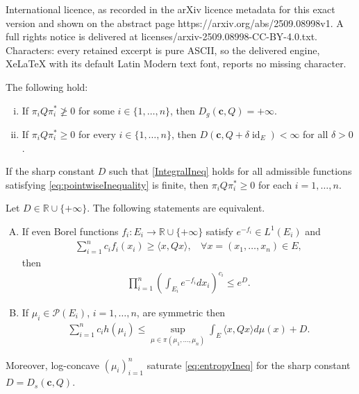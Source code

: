 \documentclass[10pt,a4paper]{amsart}
\newcommand{\id}{\operatorname{id}}
\begin{document}
International licence, as recorded in the arXiv licence metadata for this exact version and shown on the abstract page https://arxiv.org/abs/2509.08998v1. A full rights notice is delivered at licenses/arxiv-2509.08998-CC-BY-4.0.txt. Characters: every retained excerpt is pure ASCII, so the delivered engine, XeLaTeX with its default Latin Modern text font, reports no missing character.
\begin{proposition}\label{prop:Qblocks}The following hold:
\begin{enumerate}[(i)]
\item If $\pi_i Q \pi^*_i \not\geq 0$ for some $i\in \{1,\dots, n\}$, then $D_g(\mathbf{c},Q) = +\infty$.  
\item If $\pi_i Q \pi^*_i \geq 0$ for every $i\in \{1,\dots, n\}$, then $D(\mathbf{c},Q+\delta \id_E) <\infty$ for all $\delta>0$. 
\end{enumerate}
\end{proposition}

\begin{lemma}\label{lem:PropertiesDFunc} If the sharp constant $D$ such that \eqref{IntegralIneq} holds for all admissible functions satisfying \eqref{eq:pointwiseInequality} is finite,  then $\pi_i Q \pi^*_i \geq 0$ for each $i=1,\dots, n$.  
\end{lemma}

\begin{theorem}\label{thm:EntropicDuality}
Let $D \in \mathbb{R}\cup \{+\infty\}$. The following statements are equivalent.  
\begin{enumerate}[(A)]
\item If  even Borel functions $f_i: E_i \to \mathbb{R} \cup\{+\infty\}$   satisfy $e^{-f_i}\in L^1(E_i)$ and 
\begin{align}
\sum_{i=1}^n c_i f_i(x_i) \geq  \langle x, Q x\rangle, ~~~~ \forall x=(x_1, \dots, x_n) \in E, \label{eq:pointwiseInequality}
\end{align}
then 
\begin{align}
 \prod_{i=1}^n \left( \int_{E_i}e^{-f_i} d x_i\right)^{c_i} \leq e^{D}.  \label{IntegralIneq}
\end{align}
\item If $\mu_i \in \mathcal{P}(E_i)$, $i=1, \dots, n$, are symmetric then 
\begin{align}
  \sum_{i=1}^n c_i h(\mu_i) \leq \sup_{\mu \in \pi(\mu_1, \dots, \mu_n)}  \int_E \langle x, Q x\rangle d\mu(x) + D. \label{eq:entropyIneq}
\end{align}
\end{enumerate}
Moreover, log-concave $(\mu_i)_{i=1}^n$ saturate  \eqref{eq:entropyIneq} for the sharp constant $D= D_s(\mathbf{c},Q)$.
\end{theorem}
\end{document}
